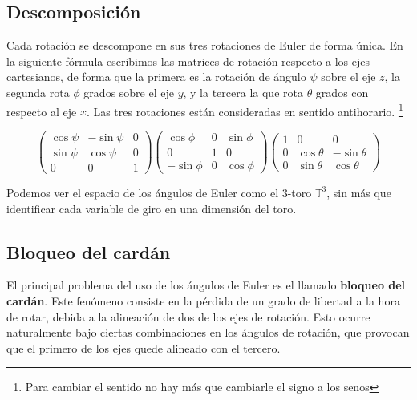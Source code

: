 \documentclass{article}
\theoremstyle{plain}
\theoremstyle{definition}
\theoremstyle{remark}
\begin{document}
\subsection{Descomposición}


Cada rotación se descompone en sus tres rotaciones de Euler de forma
única.  En la siguiente fórmula escribimos las matrices de rotación
respecto a los ejes cartesianos, de forma que la primera es la
rotación de ángulo $\psi$ sobre el eje $z$, la segunda rota $\phi$
grados sobre el eje $y$, y la tercera la que rota $\theta$ grados con
respecto al eje $x$. Las tres rotaciones están consideradas en sentido
antihorario.  \footnote{Para cambiar el sentido no hay más que
  cambiarle el signo a los senos}

\[\begin{pmatrix}
    \cos \psi & -\sin \psi & 0 \\
    \sin \psi & \cos \psi & 0 \\
    0 & 0 & 1
  \end{pmatrix}\begin{pmatrix}
      \cos \phi & 0 & \sin \phi \\
      0 & 1 & 0 \\
      -\sin \phi & 0 & \cos \phi
    \end{pmatrix}\begin{pmatrix}
    1 & 0 & 0 \\
    0 & \cos \theta & -\sin \theta \\
    0 & \sin \theta & \cos \theta
  \end{pmatrix}
\]

Podemos ver el espacio de los ángulos de Euler como el 3-toro
$\mathbb T^3$, sin más que identificar cada variable de giro en una
dimensión del toro.


\subsection{Bloqueo del cardán}

El principal problema del uso de los ángulos de Euler es el llamado
\textbf{bloqueo del cardán}. Este fenómeno consiste en la pérdida de
un grado de libertad a la hora de rotar, debida a la alineación de dos
de los ejes de rotación. Esto ocurre naturalmente bajo ciertas
combinaciones en los ángulos de rotación, que provocan que el primero
de los ejes quede alineado con el tercero.
\end{document}
